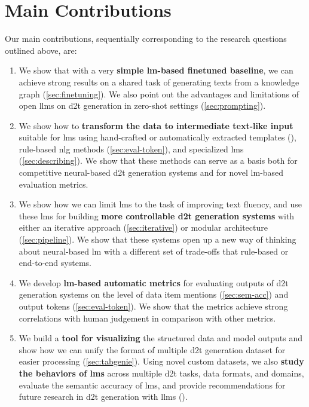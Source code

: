 \section{Main Contributions}
\label{sec:contributions}


Our main contributions, sequentially corresponding to the research questions outlined above, are:
\begin{enumerate}
    \item We show that with a very \textbf{simple \ac{lm}-based finetuned baseline}, we can achieve strong results on a shared task of generating texts from a knowledge graph (\autoref{sec:finetuning}). We also point out the advantages and limitations of open \acp{llm} on \ac{d2t} generation in zero-shot settings (\autoref{sec:prompting}).
    \item We show how to \textbf{transform the data to intermediate text-like input} suitable for \acp{lm} using hand-crafted or automatically extracted templates (), rule-based \ac{nlg} methods (\autoref{sec:eval-token}), and specialized \acp{lm} (\autoref{sec:describing}). We show that these methods can serve as a basis both for competitive neural-based \ac{d2t} generation systems and for novel \ac{lm}-based evaluation metrics.
    \item We show how we can limit \acp{lm} to the task of improving text fluency, and use these \acp{lm} for building \textbf{more controllable \ac{d2t} generation systems} with either an iterative approach (\autoref{sec:iterative}) or modular architecture (\autoref{sec:pipeline}). We show that these systems open up a new way of thinking about neural-based \ac{lm} with a different set of trade-offs that rule-based or end-to-end systems.
    \item We develop \textbf{\ac{lm}-based automatic metrics} for evaluating outputs of \ac{d2t} generation systems on the level of data item mentions (\autoref{sec:sem-acc}) and output tokens (\autoref{sec:eval-token}). We show that the metrics achieve strong correlations with human judgement in comparison with other metrics.
    \item We build a \textbf{tool for visualizing} the structured data and model outputs and show how we can unify the format of multiple \ac{d2t} generation dataset for easier processing (\autoref{sec:tabgenie}). Using novel custom datasets, we also \textbf{study the behaviors of \acp{lm}} across multiple \ac{d2t} tasks, data formats, and domains, evaluate the semantic accuracy of \acp{lm}, and provide recommendations for future research in \ac{d2t} generation with \acp{llm} ().
\end{enumerate}



